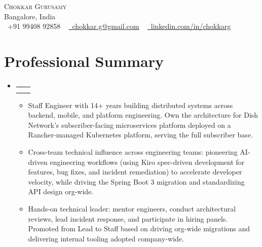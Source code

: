 \documentclass[letterpaper,11pt]{article}
\makeatletter
\newcommand{\resumeItem}[1]{
  \item\small{
    {#1 \vspace{-2pt}}
  }
}
\newcommand{\resumeSubheading}[4]{
  \vspace{-2pt}\item
    \begin{tabular*}{1.0\textwidth}[t]{l@{\extracolsep{\fill}}r}
      \textbf{#1} & \textbf{\small #2} \\
      \textit{\small#3} & \textit{\small #4} \\
    \end{tabular*}\vspace{-7pt}
}
\newcommand{\resumeSubHeadingListStart}{\begin{itemize}[leftmargin=0.0in, label={}]}
\newcommand{\resumeSubHeadingListEnd}{\end{itemize}}
\newcommand{\resumeItemListStart}{\begin{itemize}}
\newcommand{\resumeItemListEnd}{\end{itemize}\vspace{-5pt}}
\makeatother
\begin{document}
\begin{center}
    {\Huge \scshape Chokkar Gurusamy} \\ \vspace{1pt}
     Bangalore, India  \\ \vspace{1pt}
    \small \raisebox{-0.1\height}\faPhone\ +91 99408 92858 ~
    \href{mailto:chokkar.g@gmail.com}{\raisebox{-0.2\height}\faEnvelope\  \underline{chokkar.g@gmail.com}} ~
    \href{https://linkedin.com/in/chokkarg}{\raisebox{-0.2\height}\faLinkedin\ \underline{linkedin.com/in/chokkarg}}
    \vspace{-8pt}
\end{center}

\section{Professional Summary}
    \resumeSubHeadingListStart
    \vspace{-30pt}
    \resumeSubheading
      {}{}
      {}{}
\resumeItemListStart
 \resumeItem{Staff Engineer with 14+ years building distributed systems across backend, mobile, and platform engineering. Own the architecture for Dish Network's subscriber-facing microservices platform deployed on a Rancher-managed Kubernetes platform, serving the full subscriber base.}
\resumeItem{Cross-team technical influence across engineering teams: pioneering AI-driven engineering workflows (using Kiro spec-driven development for features, bug fixes, and incident remediation) to accelerate developer velocity, while driving the Spring Boot 3 migration and standardizing API design org-wide.}
  \resumeItem{Hands-on technical leader: mentor engineers, conduct architectural reviews, lead incident response, and participate in hiring panels. Promoted from Lead to Staff based on driving org-wide migrations and delivering internal tooling adopted company-wide.}
\resumeItemListEnd

  \resumeSubHeadingListEnd
\vspace{-16pt}

\end{document}
